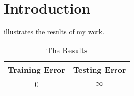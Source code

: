 \chapter{Introduction} \label{Chapter:Introduction}









 illustrates the results of my work.
\begin{table}[!htb]
  \centering
  \begin{tabular}{cc}
  \toprule
  \textbf{Training Error} & \textbf{Testing Error}\\
  \midrule
  0 & $\infty$\\
  \bottomrule
  \end{tabular}
  \caption{The Results}
  \label{Table:tabex}
\end{table}

